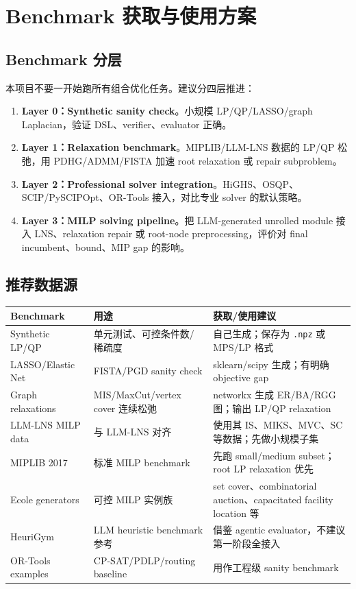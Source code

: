 \documentclass[12pt,a4paper]{ctexart}
\begin{document}
\section{Benchmark 获取与使用方案}

\subsection{Benchmark 分层}
本项目不要一开始跑所有组合优化任务。建议分四层推进：

\begin{enumerate}
    \item \textbf{Layer 0：Synthetic sanity check}。小规模 LP/QP/LASSO/graph Laplacian，验证 DSL、verifier、evaluator 正确。
    \item \textbf{Layer 1：Relaxation benchmark}。MIPLIB/LLM-LNS 数据的 LP/QP 松弛，用 PDHG/ADMM/FISTA 加速 root relaxation 或 repair subproblem。
    \item \textbf{Layer 2：Professional solver integration}。HiGHS、OSQP、SCIP/PySCIPOpt、OR-Tools 接入，对比专业 solver 的默认策略。
    \item \textbf{Layer 3：MILP solving pipeline}。把 LLM-generated unrolled module 接入 LNS、relaxation repair 或 root-node preprocessing，评价对 final incumbent、bound、MIP gap 的影响。
\end{enumerate}

\subsection{推荐数据源}

\begin{longtable}{p{}p{}p{}}
\toprule
Benchmark & 用途 & 获取/使用建议 \\
\midrule
Synthetic LP/QP & 单元测试、可控条件数/稀疏度 & 自己生成；保存为 \texttt{.npz} 或 MPS/LP 格式 \\
LASSO/Elastic Net & FISTA/PGD sanity check & sklearn/scipy 生成；有明确 objective gap \\
Graph relaxations & MIS/MaxCut/vertex cover 连续松弛 & networkx 生成 ER/BA/RGG 图；输出 LP/QP relaxation \\
LLM-LNS MILP data & 与 LLM-LNS 对齐 & 使用其 IS、MIKS、MVC、SC 等数据；先做小规模子集 \\
MIPLIB 2017 & 标准 MILP benchmark & 先跑 small/medium subset；root LP relaxation 优先 \\
Ecole generators & 可控 MILP 实例族 & set cover、combinatorial auction、capacitated facility location 等 \\
HeuriGym & LLM heuristic benchmark 参考 & 借鉴 agentic evaluator，不建议第一阶段全接入 \\
OR-Tools examples & CP-SAT/PDLP/routing baseline & 用作工程级 sanity benchmark \\
\bottomrule
\end{longtable}
\end{document}
